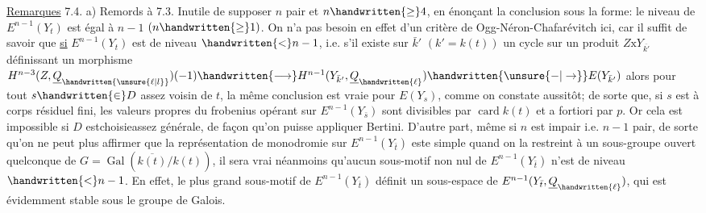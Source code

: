 \uline{Remarques} 7.4. a) Remords à 7.3. Inutile de supposer $n$ pair et $n\handwritten{\geq}4$, en énonçant la conclusion sous la forme: le niveau de $E^{n-1}(Y_t)$ est égal à $n-1$ $(n\handwritten{\geq}1)$. On n'a pas besoin en effet d'un critère de Ogg-Néron-Chafarévitch ici, car il suffit de savoir que \uline{si} $E^{n-1}(Y_t)$ est de niveau $\handwritten{<}n-1$, i.e. s'il existe sur  $\bar{k}'$ $(k'=k(t))$ un cycle sur un produit $Z\mathbin{\mathrm{x}}Y_{\overline{k'}}$ définissant un morphisme $H^{n-3}(Z,\underline{Q}_{\handwritten{\unsure{\ell|l}}})(-1)\handwritten{\longrightarrow}H^{n-1}(Y_{\bar{k}'},\underline{Q}_{\handwritten{\ell}})\handwritten{\unsure{-|\to}}E(Y_{\bar{k}'})$  alors pour tout $s\handwritten{\in}D$ assez voisin de $t$, la même conclusion est vraie pour $E(Y_s)$, comme on constate aussitôt; de sorte que, si $s$ est à corps résiduel fini, les valeurs propres du frobenius opérant sur $E^{n-1}(Y_{\bar{s}})$ sont divisibles par  $\operatorname{card}k(t)$ et a fortiori par $p$. Or cela est impossible si $D$ estchoisieassez générale, de façon qu'on puisse appliquer Bertini. D'autre part, même si $n$ est impair i.e. $n-1$ pair, de sorte qu'on ne peut plus affirmer que la  représentation de monodromie sur $E^{n-1}(Y_{\bar t})$ este simple quand on la restreint à un sous-groupe ouvert quelconque de $G=\operatorname{Gal}(\overline{k(t)}/k(t))$, il sera vrai néanmoins qu'aucun sous-motif non nul de $E^{n-1}(Y_{\bar t})$ n'est de niveau $\handwritten{<}n-1$. En effet, le plus grand sous-motif  de $E^{n-1}(Y_{\bar t})$  définit un sous-espace de $E^{n-1}(Y_{\bar t},\underline{Q}_{\handwritten{\ell}})$, qui est évidemment stable sous le groupe de Galois.

